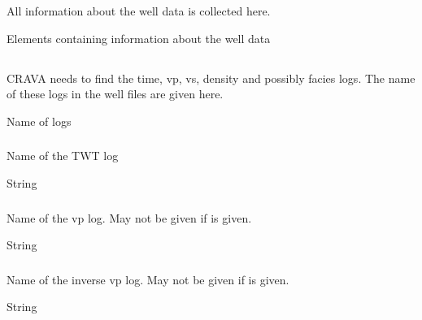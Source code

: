 \section{} 
 \slist
   \item \Description All information about the well data is collected here.
   \item \Argument Elements containing information about the well data
   \item \Default
 \elist

\subsection{} 
 \slist
   \item \Description CRAVA needs to find the time, vp, vs, density and possibly facies logs. The name of these logs in the well files are given here.
   \item \Argument Name of logs
   \item \Default
 \elist

\subsubsection{} 
 \slist
   \item \Description Name of the TWT log
   \item \Argument String
   \item \Default %
 \elist

\subsubsection{}
 \slist
   \item \Description Name of the vp log. May not be given if  is given.
   \item \Argument String
   \item \Default
 \elist

\subsubsection{}
 \slist
   \item \Description Name of the inverse vp log. May not be given if  is given.
   \item \Argument String
   \item \Default %
 \elist

